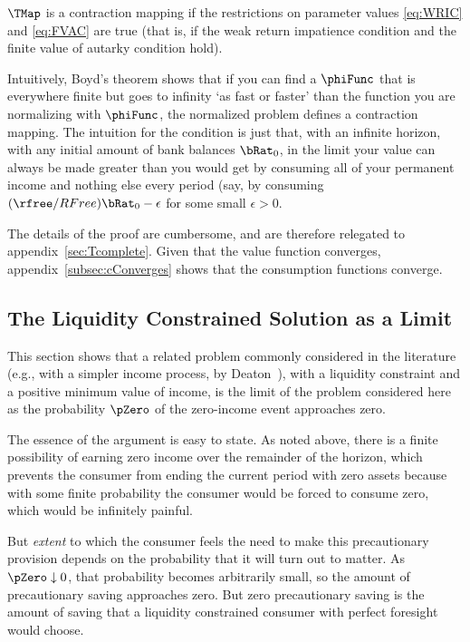 \documentclass[./BufferStockTheory.tex]{subfiles}
\begin{document}
\hypertarget{MainTheorem}{}
\setcounter{theorem}{0}
\begin{theorem}
  \label{thm:contmap} $\TMap$ is a contraction mapping if
  the restrictions on parameter values \eqref{eq:WRIC} and
  \eqref{eq:FVAC} are true (that is, if the weak return impatience condition and the finite value of autarky condition hold).
\end{theorem}

Intuitively, Boyd's theorem shows that if you can find a $\phiFunc$ that is everywhere finite but goes to infinity `as fast or faster' than the function you are normalizing with $\phiFunc$, the normalized problem defines a contraction mapping.  The intuition for the {\FVAC} condition is just that, with an infinite horizon, with any initial amount of bank balances $\bRat_{0}$, in the limit your value can always be made greater than you would get by consuming all of your permanent income and nothing else every period (say, by consuming $(\rfree/RFree)\bRat_{0}-\epsilon$ for some small $\epsilon>0$.

The details of the proof are cumbersome, and are therefore relegated to
appendix~\ref{sec:Tcomplete}.  Given that the value function
converges, appendix~\ref{subsec:cConverges} shows that the consumption
functions converge.

\hypertarget{The-Liquidity-Constrained-Solution-as-a-Limit}{}
\subsection{The Liquidity Constrained Solution as a Limit} \label{sec:deatonIsLimit}

This section shows that a related problem commonly considered in the
literature (e.g., with a simpler income process, by
Deaton~\citeyearpar{deatonLiqConstr}), with a liquidity constraint
and a positive minimum value of income, is the limit of the problem
considered here as the probability $\pZero$ of the zero-income event
approaches zero.

The essence of the argument is easy to state.  As noted above, there is a finite possibility of earning zero income over the remainder of the horizon, which prevents
the consumer from ending the current period with zero assets because
with some finite probability the consumer would be forced to consume zero,
which would be infinitely painful.

But \textit{extent} to which the consumer feels the need to make this
precautionary provision depends on the probability that it will turn
out to matter.  As $\pZero \downarrow 0$, that probability becomes
arbitrarily small, so the amount of precautionary saving approaches zero.
But zero precautionary saving is the amount of saving that a liquidity
constrained consumer with perfect foresight would choose.
\end{document}
